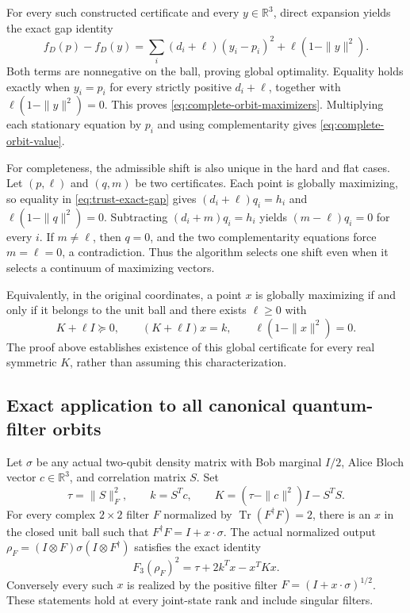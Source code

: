 For every such constructed certificate and every $y\in\mathbb R^3$,
direct expansion yields the exact gap identity
\begin{equation}
 f_D(p)-f_D(y)=
 \sum_i(d_i+\ell)(y_i-p_i)^2+\ell(1-\|y\|^2).
 \label{eq:trust-exact-gap}
\end{equation}
Both terms are nonnegative on the ball, proving global optimality.
Equality holds exactly when $y_i=p_i$ for every strictly positive
$d_i+\ell$, together with $\ell(1-\|y\|^2)=0$.
This proves \eqref{eq:complete-orbit-maximizers}.  Multiplying each
stationary equation by $p_i$ and using complementarity gives
\eqref{eq:complete-orbit-value}.

For completeness, the admissible shift is also unique in the hard and flat
cases.  Let $(p,\ell)$ and $(q,m)$ be two certificates.  Each point is
globally maximizing, so equality in \eqref{eq:trust-exact-gap} gives
$(d_i+\ell)q_i=h_i$ and $\ell(1-\|q\|^2)=0$.
Subtracting $(d_i+m)q_i=h_i$ yields $(m-\ell)q_i=0$ for every $i$.
If $m\ne\ell$, then $q=0$, and the two complementarity equations force
$m=\ell=0$, a contradiction.  Thus the algorithm selects one shift even
when it selects a continuum of maximizing vectors.

Equivalently, in the original coordinates, a point $x$ is globally
maximizing if and only if it belongs to the unit ball and there exists
$\ell\geq0$ with
\[
 K+\ell I\succeq0,\qquad (K+\ell I)x=k,
 \qquad \ell(1-\|x\|^2)=0.
\]
The proof above establishes existence of this global certificate for every
real symmetric $K$, rather than assuming this characterization.

\subsection{Exact application to all canonical quantum-filter orbits}

Let $\sigma$ be any actual two-qubit density matrix with Bob marginal $I/2$,
Alice Bloch vector $c\in\mathbb R^3$, and correlation matrix $S$.
Set
\begin{equation}
 \tau=\|S\|_F^2,\qquad k=S^Tc,\qquad
 K=(\tau-\|c\|^2)I-S^TS.
 \label{eq:physical-trust-data}
\end{equation}
For every complex $2\times2$ filter $F$ normalized by
$\operatorname{Tr}(F^\dagger F)=2$, there is an $x$ in the closed unit ball
such that $F^\dagger F=I+x\cdot\sigma$.  The actual normalized output
$\rho_F=(I\otimes F)\sigma(I\otimes F^\dagger)$ satisfies the exact identity
\begin{equation}
 F_3(\rho_F)^2=\tau+2k^Tx-x^TKx.
 \label{eq:physical-complete-objective}
\end{equation}
Conversely every such $x$ is realized by the positive filter
$F=(I+x\cdot\sigma)^{1/2}$.  These statements hold at every joint-state
rank and include singular filters.


